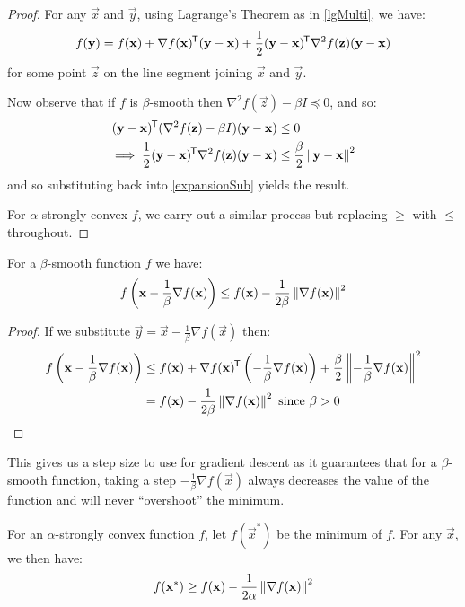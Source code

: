 \documentclass[../main.tex]{subfiles}
\begin{document}
\begin{proof}
  For any $\vec{x}$ and $\vec{y}$, using Lagrange's Theorem as in \cref{lgMulti}, we have:
  \begin{align}
    f(\mathbf{\bm{y}}) = f(\mathbf{\bm{x}}) + \nabla f(\mathbf{\bm{x}})^{{\mkern-1.5mu\mathsf{T}}} (\mathbf{\bm{y}} - \mathbf{\bm{x}}) + \frac{1}{2}(\mathbf{\bm{y}} - \mathbf{\bm{x}})^{{\mkern-1.5mu\mathsf{T}}} \nabla^2 f(\mathbf{\bm{z}}) (\mathbf{\bm{y}} - \mathbf{\bm{x}}) \label{expansionSub}
  \end{align}
  for some point $\vec{z}$ on the line segment joining $\vec{x}$ and $\vec{y}$.

  Now observe that if $f$ is $\beta$-smooth then $\nabla^2 f(\vec{z}) - \beta I \preceq 0$, and so:
  \begin{align*}
    (\mathbf{\bm{y}} - \mathbf{\bm{x}})^{{\mkern-1.5mu\mathsf{T}}} (\nabla^2 f(\mathbf{\bm{z}}) - \beta I) (\mathbf{\bm{y}} - \mathbf{\bm{x}}) &\leq 0 \\
    \implies \frac{1}{2} (\mathbf{\bm{y}} - \mathbf{\bm{x}})^{{\mkern-1.5mu\mathsf{T}}} \nabla^2 f(\mathbf{\bm{z}}) (\mathbf{\bm{y}} - \mathbf{\bm{x}}) &\leq \frac{\beta}{2} \left\lVert \mathbf{\bm{y}} - \mathbf{\bm{x}} \right\rVert^2
  \end{align*}
  and so substituting back into \cref{expansionSub} yields the result.

  For $\alpha$-strongly convex $f$, we carry out a similar process but replacing $\geq$ with $\leq$ throughout.
\end{proof}
\begin{corollary}
  For a $\beta$-smooth function $f$ we have: \label{bSmoothCoro}
  \[
    f\left(\mathbf{\bm{x}} - \frac{1}{\beta} \nabla f(\mathbf{\bm{x}})\right) \leq f(\mathbf{\bm{x}}) - \frac{1}{2\beta}\left\lVert \nabla f(\mathbf{\bm{x}}) \right\rVert^2
  \]
\end{corollary}
\begin{proof}
  If we substitute $\vec{y} = \vec{x} - \frac{1}{\beta}\nabla f(\vec{x})$ then:
  \begin{align*}
    f\left(\mathbf{\bm{x}} - \frac{1}{\beta} \nabla f(\mathbf{\bm{x}})\right) &\leq f(\mathbf{\bm{x}}) + \nabla f(\mathbf{\bm{x}})^{{\mkern-1.5mu\mathsf{T}}} \left(- \frac{1}{\beta} \nabla f(\mathbf{\bm{x}})\right) + \frac{\beta}{2} \left\lVert -\frac{1}{\beta} \nabla f(\mathbf{\bm{x}}) \right\rVert^2 \\
                                                              &= f(\mathbf{\bm{x}}) - \frac{1}{2\beta} \left\lVert \nabla f(\mathbf{\bm{x}}) \right\rVert^2 \text{ since $\beta > 0$}
  \end{align*}
\end{proof}
This gives us a step size to use for gradient descent as it guarantees that for a $\beta$-smooth function, taking a step $-\frac{1}{\beta}\nabla f(\vec{x})$ always decreases the value of the function and will never ``overshoot'' the minimum.
\begin{corollary}
  For an $\alpha$-strongly convex function $f$, let $f(\vec{x}^{*})$ be the minimum of $f$.
  For any $\vec{x}$, we then have: \label{aStrongCoro}
  \[
    f(\mathbf{\bm{x}}^{*}) \geq f(\mathbf{\bm{x}}) - \frac{1}{2\alpha} \left\lVert \nabla f(\mathbf{\bm{x}}) \right\rVert^2
  \]
\end{corollary}
\end{document}
